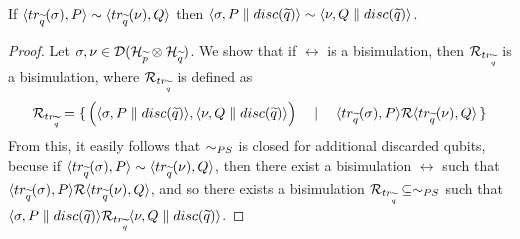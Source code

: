 \begin{theorem}\label{bisim_closed_by_discard}
If $\langle tr_{\widetilde{q}}(\sigma), P\rangle \sim \langle tr_{\widetilde{q}}(\nu), Q\rangle$ then $\langle\sigma, P \parallel disc(\widetilde{q})\rangle \sim \langle\nu, Q \parallel disc(\widetilde{q})\rangle$.
\end{theorem}
\newcommand{\relTrQ}{\rel_{\trQ}}
\begin{proof} 
Let $\sigma, \nu \in \mathcal{D}(\mathcal{H}_{\widetilde{p}} \otimes \mathcal{H}_{\widetilde{q}})$. We show that if $\rel$ is a bisimulation, then $\mathcal{R}_{tr_{\widetilde{q}}}$ is a bisimulation, where $\mathcal{R}_{tr_{\widetilde{q}}}$ is defined as
\[\mathcal{R}_{tr_{\widetilde{q}}} = \set{\Big(\langle\sigma, P \parallel disc(\widetilde{q})\rangle, \langle\nu, Q \parallel disc(\widetilde{q})\rangle\Big) \quad\mid\quad \langle tr_{\widetilde{q}}(\sigma), P\rangle \mathcal{R}\langle tr_{\widetilde{q}}(\nu), Q\rangle}\]
From this, it easily follows that $\sim_{PS}$ is closed for additional discarded qubits, becuse if $\langle tr_{\widetilde{q}}(\sigma), P\rangle \sim \langle tr_{\widetilde{q}}(\nu), Q\rangle$, then there exist a bisimulation $\rel$ such that $\langle tr_{\widetilde{q}}(\sigma), P\rangle \mathcal{R} \langle tr_{\widetilde{q}}(\nu), Q\rangle$, and so there exists a bisimulation $\relTrQ \subseteq \simps$ such that $\confw{\sigma, P \parallel \discQ} \relTrQ \confw{\nu, Q \parallel \discQ}$.


\end{proof}
